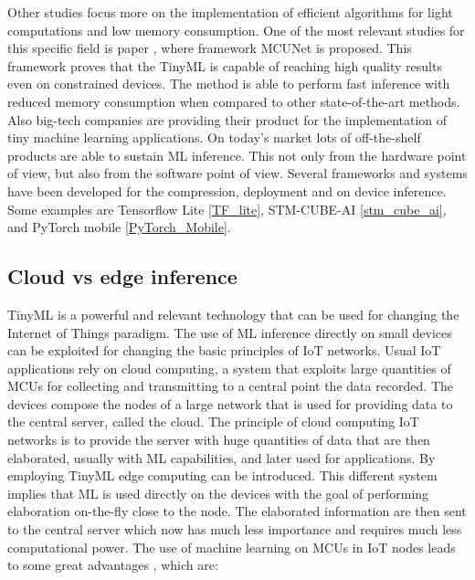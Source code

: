 \documentclass[12pt]{report}
\begin{document}
Other studies focus more on the implementation of efficient algorithms for light computations and low memory consumption. One of the most relevant studies for this specific field is paper \cite{lin2020mcunet}, where framework MCUNet is proposed. This framework proves that the TinyML is capable of reaching high quality results even on constrained devices. The method is able to perform fast inference with reduced memory consumption when compared to other state-of-the-art methods.\\
Also big-tech companies are providing their product for the implementation of tiny machine learning applications. On today's market lots of off-the-shelf products are able to sustain ML inference. This not only from the hardware point of view, but also from the software point of view. Several frameworks and systems have been developed for the compression, deployment and on device inference. Some examples are Tensorflow Lite \ref{TF_lite}, STM-CUBE-AI \ref{stm_cube_ai}, and PyTorch mobile \ref{PyTorch_Mobile}.

\subsection{Cloud vs edge inference}
TinyML is a powerful and relevant technology that can be used for changing the Internet of Things paradigm. The use of ML inference directly on small devices can be exploited for changing the basic principles of IoT networks. Usual IoT applications rely on cloud computing, a system that exploits large quantities of MCUs for collecting and transmitting to a central point the data recorded. The devices compose the nodes of a large network that is used for providing data to the central server, called the cloud. The principle of cloud computing IoT networks is to provide the server with huge quantities of data that are then elaborated, usually with ML capabilities, and later used for applications. By employing TinyML edge computing can be introduced. This different system implies that ML is used directly on the devices with the goal of performing elaboration on-the-fly close to the node. The elaborated information are then sent to the central server which now has much less importance and requires much less computational power. The use of machine learning on MCUs in IoT nodes leads to some great advantages \cite{yu2017survey}, which are:
\end{document}
